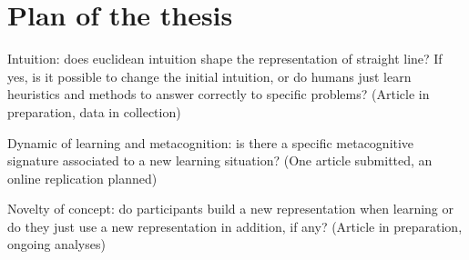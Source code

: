 \documentclass[11pt]{beamer}
\begin{document}
        \section{Plan of the thesis}
        
        \begin{frame}
          
         \textcolor{bittersweet}{Intuition:} does euclidean intuition shape the representation of straight line? If yes, is it possible to change the initial intuition, or do humans just learn heuristics and methods to answer correctly to specific problems? (Article in preparation, data in collection)
          
         \textcolor{bittersweet}{ Dynamic of learning and metacognition:}
          is there a specific metacognitive signature associated to a new learning situation? (One article submitted, an online replication planned) 
          

          \textcolor{bittersweet}{Novelty of concept}: do participants build a new representation when learning or do they just use a new representation in addition, if any? (Article in preparation, ongoing analyses) 

        \end{frame}

             

          

          






 


        
\end{document}
